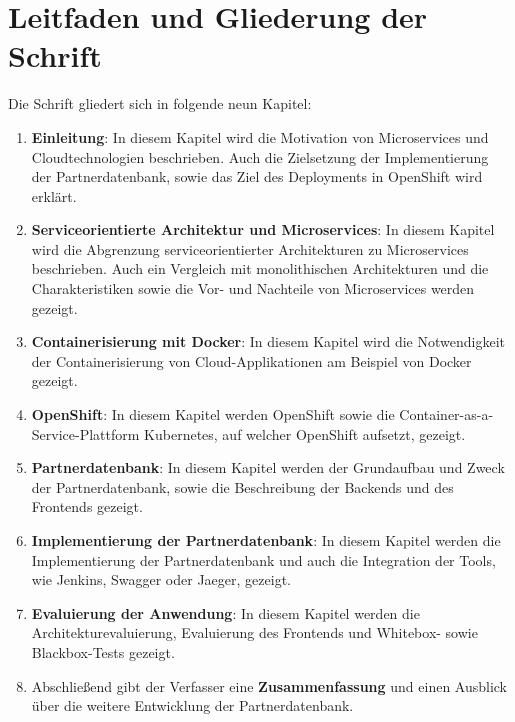\section{Leitfaden und Gliederung der Schrift}
Die Schrift gliedert sich in folgende neun Kapitel:
\begin{enumerate}
	\item \textbf{Einleitung}: In diesem Kapitel wird die Motivation von Microservices und Cloudtechnologien beschrieben. Auch die Zielsetzung der Implementierung der Partnerdatenbank, sowie das Ziel des Deployments in OpenShift wird erklärt.
	\item \textbf{Serviceorientierte Architektur und Microservices}: In diesem Kapitel wird die Abgrenzung serviceorientierter Architekturen zu Microservices beschrieben. Auch ein Vergleich mit monolithischen Architekturen und die Charakteristiken sowie die Vor- und Nachteile von Microservices werden gezeigt.
	\item \textbf{Containerisierung mit Docker}: In diesem Kapitel wird die Notwendigkeit der Containerisierung von Cloud-Applikationen am Beispiel von Docker gezeigt.
	\item \textbf{OpenShift}: In diesem Kapitel werden OpenShift sowie die Container-as-a-Service-Plattform Kubernetes, auf welcher OpenShift aufsetzt, gezeigt.
	\item \textbf{Partnerdatenbank}: In diesem Kapitel werden der Grundaufbau und Zweck der Partnerdatenbank, sowie die Beschreibung der Backends und des Frontends gezeigt.
	\item \textbf{Implementierung der Partnerdatenbank}: In diesem Kapitel werden die Implementierung der Partnerdatenbank und auch die Integration der Tools, wie Jenkins, Swagger oder Jaeger, gezeigt.
	\item \textbf{Evaluierung der Anwendung}: In diesem Kapitel werden die Architekturevaluierung, Evaluierung des Frontends und Whitebox- sowie Blackbox-Tests gezeigt.
	\item Abschließend gibt der Verfasser eine \textbf{Zusammenfassung} und einen Ausblick über die weitere Entwicklung der Partnerdatenbank.
\end{enumerate}